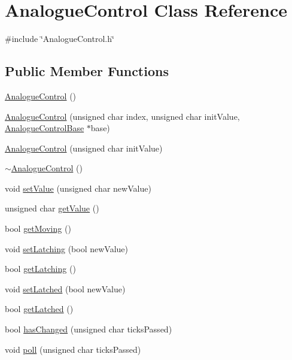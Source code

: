 \hypertarget{class_analogue_control}{}\section{Analogue\+Control Class Reference}
\label{class_analogue_control}


{\ttfamily \#include \char`\"{}Analogue\+Control.\+h\char`\"{}}

\subsection*{Public Member Functions}
\begin{DoxyCompactItemize}
\item 
\hyperlink{class_analogue_control_aad4d11c644df1b2b31e32333aceb5d1a}{Analogue\+Control} ()
\item 
\hyperlink{class_analogue_control_a58826c0582ce0697d1c03a92991a648c}{Analogue\+Control} (unsigned char index, unsigned char init\+Value, \hyperlink{class_analogue_control_base}{Analogue\+Control\+Base} $\ast$base)
\item 
\hyperlink{class_analogue_control_af5c00f8da0a5b050a6552e4d111bfe39}{Analogue\+Control} (unsigned char init\+Value)
\item 
\hyperlink{class_analogue_control_a08a12843e8a0a1cb8a0ef9da3865a453}{$\sim$\+Analogue\+Control} ()
\item 
void \hyperlink{class_analogue_control_a160ce73eb8eebdf131dca4dcebc44a42}{set\+Value} (unsigned char new\+Value)
\item 
unsigned char \hyperlink{class_analogue_control_ad92cad38f19cedae45aeeab748ddb455}{get\+Value} ()
\item 
bool \hyperlink{class_analogue_control_a1c2b0439a77656ce62ddc69ee851cb86}{get\+Moving} ()
\item 
void \hyperlink{class_analogue_control_af9129cb76c8fb8ea46e5fea1ea00be73}{set\+Latching} (bool new\+Value)
\item 
bool \hyperlink{class_analogue_control_a69b90c306b7831a3addb30b6683ec171}{get\+Latching} ()
\item 
void \hyperlink{class_analogue_control_a3dd85b57a3fe8eceddcd2e4bbfce1ea9}{set\+Latched} (bool new\+Value)
\item 
bool \hyperlink{class_analogue_control_a0fd8ee45aa916be0b7ba0bdccab41033}{get\+Latched} ()
\item 
bool \hyperlink{class_analogue_control_ab670265f948d7416bcf07c91dcf97bce}{has\+Changed} (unsigned char ticks\+Passed)
\item 
void \hyperlink{class_analogue_control_a5ec0b55a6abd8c73e61f86f2322251a5}{poll} (unsigned char ticks\+Passed)
\end{DoxyCompactItemize}


